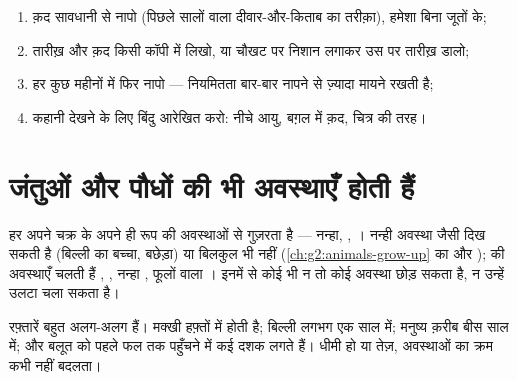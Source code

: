 \begin{method}\label{met:g3:stages-of-life:keep}
\begin{enumerate}
  \item क़द सावधानी से नापो (पिछले सालों वाला दीवार-और-किताब का
        तरीक़ा), हमेशा बिना जूतों के;
  \item तारीख़ और क़द किसी कॉपी में लिखो, या चौखट पर निशान लगाकर उस पर
        तारीख़ डालो;
  \item हर कुछ महीनों में फिर नापो --- नियमितता बार-बार नापने से
        ज़्यादा मायने रखती है;
  \item कहानी देखने के लिए बिंदु आरेखित करो: नीचे आयु, बग़ल में क़द,
        चित्र की तरह।
\end{enumerate}
\end{method}

\section{जंतुओं और पौधों की भी अवस्थाएँ होती हैं}

\begin{proposition}[जीवित दुनिया भर की अवस्थाएँ]\label{prop:g3:stages-of-life:animals}
हर  अपने चक्र के अपने ही रूप की अवस्थाओं से गुज़रता है --- नन्हा,
, । नन्ही अवस्था  जैसी दिख सकती है (बिल्ली का बच्चा,
बछेड़ा) या बिलकुल भी नहीं (\cref{ch:g2:animals-grow-up} का  और
);  की अवस्थाएँ चलती हैं , , नन्हा , फूलों वाला
। इनमें से कोई भी न तो कोई अवस्था छोड़ सकता है, न उन्हें उलटा चला
सकता है।
\end{proposition}
\admitted

\begin{example}[कितना तेज़, कितना धीमा]\label{ex:g3:stages-of-life:speeds}
रफ़्तारें बहुत अलग-अलग हैं। मक्खी हफ़्तों में  होती है; बिल्ली
लगभग एक साल में; मनुष्य क़रीब बीस साल में; और बलूत को पहले फल तक
पहुँचने में कई दशक लगते हैं। धीमी हो या तेज़, अवस्थाओं का क्रम कभी नहीं
बदलता।
\end{example}

